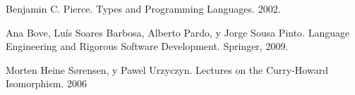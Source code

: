 \documentclass[a4paper,11pt]{article}
\theoremstyle{definition}
\theoremstyle{remark}
\begin{document}


\begin{thebibliography}{9}
  Benjamin C. Pierce. 
  Types and Programming Languages. 2002.

  Ana Bove, Luís Soares Barbosa,
  Alberto Pardo, y
  Jorge Sousa Pinto.
  Language Engineering and Rigorous Software Development.
  Springer, 2009.

  Morten Heine Sørensen, y Pawel Urzyczyn.
  Lectures on the Curry-Howard Isomorphism.
  2006

\end{thebibliography}
\end{document}
